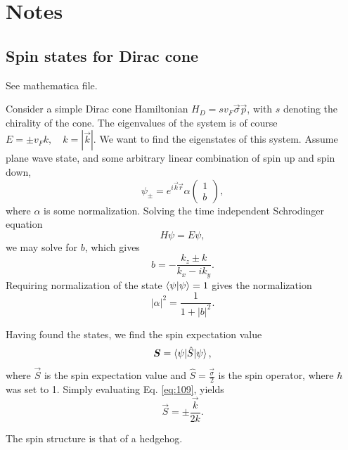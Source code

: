 \section{Notes}
\subsection{Spin states for Dirac cone}
See mathematica file.

Consider a simple Dirac cone Hamiltonian \(H_{D} = s v_{F} \vec{\sigma} \vec{p}\), with \(s\) denoting the chirality of the cone.
The eigenvalues of the system is of course \(E = \pm v_{F} k, \quad k=|\vec{k}|\).
We want to find the eigenstates of this system.
Assume plane wave state, and some arbitrary linear combination of spin up and spin down,
\[
  \psi _{\pm} = e^{i \vec{k} \vec{r}} \alpha
  \begin{pmatrix}
    1\\
    b
  \end{pmatrix},
\]
where \(\alpha \) is some normalization.
Solving the time independent Schrodinger equation
\[
H \psi = E \psi,
\]
we may solve for \(b\), which gives
\begin{equation}
  \label{eq:108}
  b = -\frac{k_{z} \pm k}{k_{x} - i k_{y}}.
\end{equation}
Requiring normalization of the state \(\braket{\psi | \psi } = 1\) gives the normalization
\[
|\alpha |^2 = \frac{1}{1 + |b|^2}.
\]

Having found the states, we find the spin expectation value
\begin{equation}
  \label{eq:109}
  \bm{S} = \braket{\psi | \hat{S} | \psi },
\end{equation}
where \(\vec{S}\) is the spin expectation value and \(\hat{S} = \frac{\vec{\sigma}}{2} \) is the spin operator, where \(\hbar \) was set to 1.
Simply evaluating Eq. \eqref{eq:109}, yields
\begin{equation}
  \label{eq:110}
  \vec{S} = \pm \frac{\vec{k}}{2 k}.
\end{equation}

The spin structure is that of a hedgehog.

